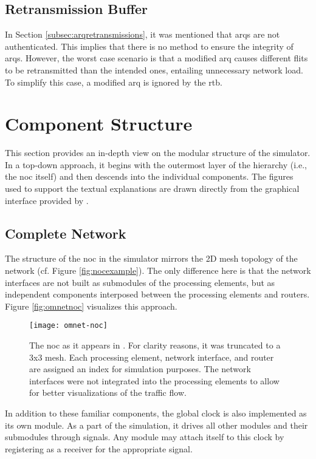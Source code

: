 \subsection{Retransmission Buffer}
In Section \ref{subsec:arqretransmissions}, it was mentioned that \glspl{arq} are not authenticated. This implies that there is no method to ensure
the integrity of \glspl{arq}. However, the worst case scenario is that a modified \gls{arq} causes different flits to be retransmitted than the
intended ones, entailing unnecessary network load. To simplify this case, a modified \gls{arq} is ignored by the \gls{rtb}.

\section{Component Structure}\label{sec:componentstructure}
This section provides an in-depth view on the modular structure of the simulator. In a top-down approach, it begins with the outermost layer of the
hierarchy (i.e., the \gls{noc} itself) and then descends into the individual components. The figures used to support the textual explanations are
drawn directly from the graphical interface provided by \omnet{}.

\subsection{Complete Network}
The structure of the \gls{noc} in the simulator mirrors the 2D mesh topology of the network (cf. Figure \ref{fig:nocexample}). The only difference
here is that the network interfaces are not built as submodules of the processing elements, but as independent components interposed between the
processing elements and routers. Figure \vref{fig:omnetnoc} visualizes this approach.

\begin{figure}
    \centering
    \texttt{[image: omnet-noc]}
    \caption[Simulator view of the NoC]{The \gls{noc} as it appears in \omnet{}. For clarity reasons, it was truncated to a 3x3 mesh. Each processing
    element, network interface, and router are assigned an index for simulation purposes. The network interfaces were not integrated into the
    processing elements to allow for better visualizations of the traffic flow.}
    \label{fig:omnetnoc}
\end{figure}

In addition to these familiar components, the global clock is also implemented as its own module. As a part of the simulation, it drives all other
modules and their submodules through signals. Any module may attach itself to this clock by registering as a receiver for the appropriate signal.

